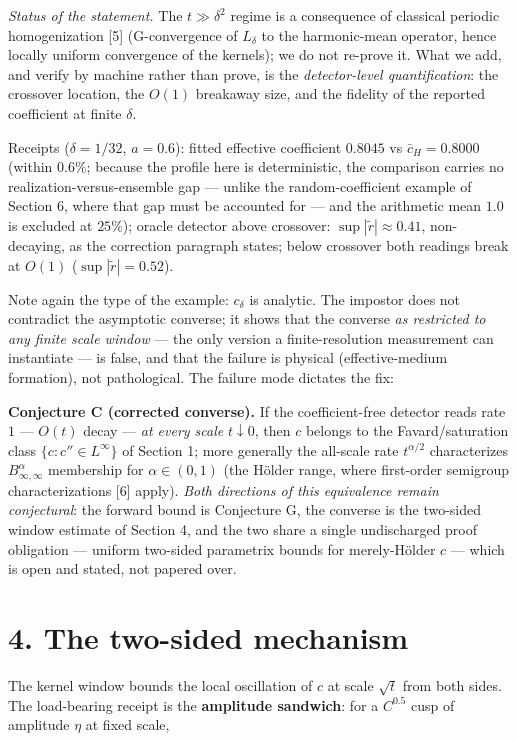 \documentclass[11pt]{article}
\begin{document}
\emph{Status of the statement.}  The $t \gg \delta^2$ regime is a consequence of classical periodic homogenization [5] (G-convergence of $L_\delta$ to the harmonic-mean operator, hence locally uniform convergence of the kernels); we do not re-prove it.  What we add, and verify by machine rather than prove, is the \emph{detector-level quantification}: the crossover location, the $O(1)$ breakaway size, and the fidelity of the reported coefficient at finite $\delta$.

Receipts ($\delta = 1/32$, $a = 0.6$): fitted effective coefficient $0.8045$ vs $\bar c_H = 0.8000$ (within $0.6\%$; because the profile here is deterministic, the comparison carries no realization-versus-ensemble gap — unlike the random-coefficient example of Section 6, where that gap must be accounted for — and the arithmetic mean $1.0$ is excluded at $25\%$); oracle detector above crossover: $\sup|\tilde r| \approx 0.41$, non-decaying, as the correction paragraph states; below crossover both readings break at $O(1)$ ($\sup|\tilde r| = 0.52$).

Note again the type of the example: $c_\delta$ is analytic.  The impostor does not contradict the asymptotic converse; it shows that the converse \emph{as restricted to any finite scale window} — the only version a finite-resolution measurement can instantiate — is false, and that the failure is physical (effective-medium formation), not pathological.  The failure mode dictates the fix:

\textbf{Conjecture C (corrected converse).}  If the coefficient-free detector reads rate $1$ — $O(t)$ decay — \emph{at every scale} $t \downarrow 0$, then $c$ belongs to the Favard/saturation class $\{c : c'' \in L^\infty\}$ of Section 1; more generally the all-scale rate $t^{\alpha/2}$ characterizes $B^\alpha_{\infty,\infty}$ membership for $\alpha \in (0,1)$ (the Hölder range, where first-order semigroup characterizations [6] apply).  \emph{Both directions of this equivalence remain conjectural}: the forward bound is Conjecture G, the converse is the two-sided window estimate of Section 4, and the two share a single undischarged proof obligation — uniform two-sided parametrix bounds for merely-Hölder $c$ — which is open and stated, not papered over.

\section*{4. The two-sided mechanism}
The kernel window bounds the local oscillation of $c$ at scale $\sqrt t$ from both sides.  The load-bearing receipt is the \textbf{amplitude sandwich}: for a $C^{0.5}$ cusp of amplitude $\eta$ at fixed scale,
\end{document}
